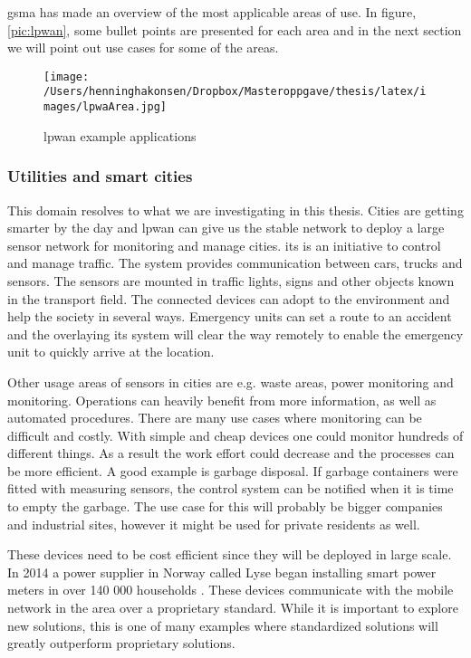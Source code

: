 \documentclass[USenglish]{ifimaster}  %
\begin{document}
\acrfull{gsma} has made an overview of the most applicable areas of use. In figure, \vref{pic:lpwan}, some bullet points are presented for each area and in the next section we will point out use cases for some of the areas.

\begin{figure}[ht]
  \centering\texttt{[image: /Users/henninghakonsen/Dropbox/Masteroppgave/thesis/latex/images/lpwaArea.jpg]}
  \caption{\acrshort{lpwan} example applications \cite{online:lpwaFuture}}
  \label{pic:lpwan}
\end{figure}

\subsubsection{Utilities and smart cities}
This domain resolves to what we are investigating in this thesis. Cities are getting smarter by the day and \acrshort{lpwan} can give us the stable network to deploy a large sensor network for monitoring and manage cities. \acrfull{its} is an initiative to control and manage traffic. The system provides communication between cars, trucks and sensors. The sensors are mounted in traffic lights, signs and other objects known in the transport field. The connected devices can adopt to the environment and help the society in several ways. Emergency units can set a route to an accident and the overlaying \acrshort{its} system will clear the way remotely to enable the emergency unit to quickly arrive at the location.

Other usage areas of sensors in cities are e.g. waste areas, power monitoring and  monitoring. Operations can heavily benefit from more information, as well as automated procedures. There are many use cases where monitoring can be difficult and costly. With simple and cheap devices one could monitor hundreds of different things. As a result the work effort could decrease and the processes can be more efficient. A good example is garbage disposal. If garbage containers were fitted with measuring sensors, the control system can be notified when it is time to empty the garbage. The use case for this will probably be bigger companies and industrial sites, however it might be used for private residents as well.

These devices need to be cost efficient since they will be deployed in large scale. In 2014 a power supplier in Norway called Lyse began installing smart power meters in over 140 000 households \cite{online:lyseAMS}. These devices communicate with the mobile network in the area over a proprietary standard. While it is important to explore new solutions, this is one of many examples where standardized solutions will greatly outperform proprietary solutions.
\end{document}
